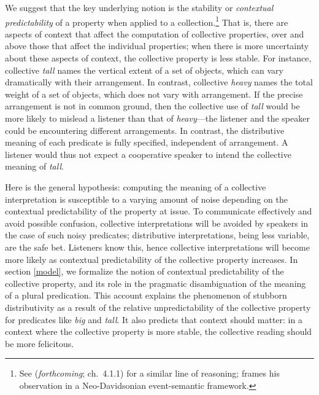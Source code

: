 \documentclass[preprint,12pt,authoryear,titlepage]{elsarticle}
\begin{document}
We suggest that the key underlying notion is the stability or \emph{contextual predictability} of a property when applied to a collection.\footnote{See \citeauthor{schein} (\emph{forthcoming}; ch.~4.1.1) for a similar line of reasoning; \citeauthor{schein} frames his observation in a Neo-Davidsonian event-semantic framework.}
That is, there are aspects of context that affect the computation of collective properties, over and above those that affect the individual properties; when there is more uncertainty about these aspects of context, the collective property is less stable.
For instance, collective \emph{tall} names the vertical extent of a set of objects, which can vary dramatically with their arrangement.
In contrast, collective \emph{heavy} names the total weight of a set of objects, which does not vary with arrangement. 
If the precise arrangement is not in common ground, then the collective use of \emph{tall} would be more likely to mislead a listener than that of \emph{heavy}---the listener and the speaker could be encountering different arrangements. In contrast, the distributive meaning of each predicate is fully specified, independent of arrangement. A listener would thus not expect a cooperative speaker to intend the collective meaning of \emph{tall}.

Here is the general hypothesis: computing the meaning of a collective interpretation is susceptible to a varying amount of noise depending on the contextual predictability of the property at issue.
To communicate effectively and avoid possible confusion, collective interpretations will be avoided by speakers in the case of such noisy predicates; distributive interpretations, being less variable, are the safe bet. 
Listeners know this, hence collective interpretations will become more likely as contextual predictability of the collective property increases.
In section \ref{model}, we formalize the notion of contextual predictability of the collective property, and its role in the pragmatic disambiguation of the meaning of a plural predication.
This account explains the phenomenon of stubborn distributivity as a result of the relative unpredictability of the collective property for predicates like \emph{big} and \emph{tall}.
It also predicts that context should matter: in a context where the collective property is more stable, the collective reading should be more felicitous.
\end{document}
